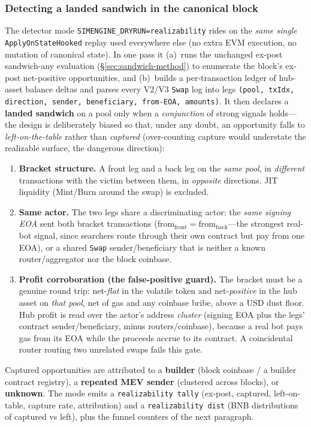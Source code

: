 \documentclass[11pt]{article}
\newcommand{\code}[1]{\texttt{#1}}
\begin{document}
\subsubsection{Detecting a landed sandwich in the canonical block}
The detector mode \code{SIMENGINE\_DRYRUN=realizability} rides on the \emph{same
single} \code{ApplyOnStateHooked} replay used everywhere else (no extra EVM execution,
no mutation of canonical state). In one pass it (a)~runs the unchanged ex-post
sandwich-any evaluation (\S\ref{sec:sandwich-method}) to enumerate the block's ex-post
net-positive opportunities, and (b)~builds a per-transaction ledger of hub-asset
balance deltas and parses every V2/V3 \code{Swap} log into legs
\code{(pool, txIdx, direction, sender, beneficiary, from-EOA, amounts)}. It then
declares a \textbf{landed sandwich} on a pool only when a \emph{conjunction} of strong
signals holds---the design is deliberately biased so that, under any doubt, an
opportunity falls to \emph{left-on-the-table} rather than \emph{captured}
(over-counting capture would understate the realizable surface, the dangerous
direction):
\begin{enumerate}
  \item \textbf{Bracket structure.} A front leg and a back leg on the \emph{same
    pool}, in \emph{different} transactions with the victim between them, in
    \emph{opposite} directions. JIT liquidity (Mint/Burn around the swap) is excluded.
  \item \textbf{Same actor.} The two legs share a discriminating actor: the \emph{same
    signing EOA} sent both bracket transactions
    ($\text{from}_{\text{front}}=\text{from}_{\text{back}}$---the strongest real-bot
    signal, since searchers route through their own contract but pay from one EOA), or
    a shared \code{Swap} sender/beneficiary that is neither a known router/aggregator
    nor the block coinbase.
  \item \textbf{Profit corroboration (the false-positive guard).} The bracket must be
    a genuine round trip: net-\emph{flat} in the volatile token and net-\emph{positive}
    in the hub asset on \emph{that pool}, net of gas and any coinbase bribe, above a
    USD dust floor. Hub profit is read over the actor's address \emph{cluster}
    (signing EOA plus the legs' contract sender/beneficiary, minus routers/coinbase),
    because a real bot pays gas from its EOA while the proceeds accrue to its contract.
    A coincidental router routing two unrelated swaps fails this gate.
\end{enumerate}
Captured opportunities are attributed to a \textbf{builder} (block coinbase / a
builder contract registry), a \textbf{repeated MEV sender} (clustered across blocks),
or \textbf{unknown}. The mode emits a \code{realizability tally} (ex-post, captured,
left-on-table, capture rate, attribution) and a \code{realizability dist} (BNB
distributions of captured vs left), plus the funnel counters of the next paragraph.
\end{document}
